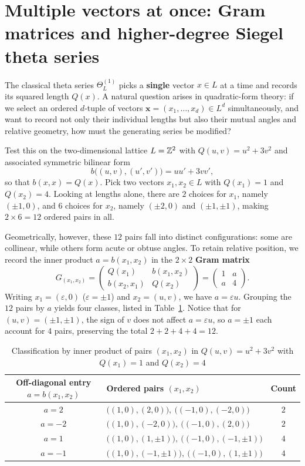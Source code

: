 \section{Multiple vectors at once: Gram matrices and higher-degree Siegel theta series}

The classical theta series $\Theta_L^{(1)}$ picks a \textbf{single} vector $x\in L$ at a time and records its squared length $Q(x)$. A natural question arises in quadratic-form theory: if we select an ordered $d$-tuple of vectors $\mathbf x=(x_1,\ldots,x_d)\in L^d$ simultaneously, and want to record not only their individual lengths but also their mutual angles and relative geometry, how must the generating series be modified?

Test this on the two-dimensional lattice $L=\mathbb{Z}^2$ with $Q(u,v)=u^2+3v^2$ and associated symmetric bilinear form
\[
b\bigl((u,v),(u',v')\bigr)=uu'+3vv',
\]
so that $b(x,x)=Q(x)$. Pick two vectors $x_1,x_2\in L$ with $Q(x_1)=1$ and $Q(x_2)=4$. Looking at lengths alone, there are $2$ choices for $x_1$, namely $(\pm 1,0)$, and $6$ choices for $x_2$, namely $(\pm 2,0)$ and $(\pm 1,\pm 1)$, making $2\times 6=12$ ordered pairs in all.

Geometrically, however, these $12$ pairs fall into distinct configurations: some are collinear, while others form acute or obtuse angles. To retain relative position, we record the inner product $a=b(x_1,x_2)$ in the $2\times 2$ \textbf{Gram matrix}
\[
G_{(x_1,x_2)}=\begin{pmatrix} Q(x_1) & b(x_1,x_2) \\ b(x_2,x_1) & Q(x_2) \end{pmatrix}=\begin{pmatrix} 1 & a \\ a & 4 \end{pmatrix}.
\]
Writing $x_1=(\varepsilon,0)$ ($\varepsilon=\pm 1$) and $x_2=(u,v)$, we have $a=\varepsilon u$. Grouping the $12$ pairs by $a$ yields four classes, listed in Table~\ref{tab:appC-gram-pairs}. Notice that for $(u,v)=(\pm 1,\pm 1)$, the sign of $v$ does not affect $a=\varepsilon u$, so $a=\pm 1$ each account for $4$ pairs, preserving the total $2+2+4+4=12$.

\begin{table}[htbp]
\centering
\caption{Classification by inner product of pairs $(x_1,x_2)$ in $Q(u,v)=u^2+3v^2$ with $Q(x_1)=1$ and $Q(x_2)=4$}
\label{tab:appC-gram-pairs}
\small
\begin{tabular}{@{}clc@{}}
\toprule
Off-diagonal entry $a=b(x_1,x_2)$ & Ordered pairs $(x_1,x_2)$ & Count \\
\midrule
$a=2$ & $\bigl((1,0),(2,0)\bigr),\ \bigl((-1,0),(-2,0)\bigr)$ & $2$ \\
$a=-2$ & $\bigl((1,0),(-2,0)\bigr),\ \bigl((-1,0),(2,0)\bigr)$ & $2$ \\
$a=1$ & $\bigl((1,0),(1,\pm 1)\bigr),\ \bigl((-1,0),(-1,\pm 1)\bigr)$ & $4$ \\
$a=-1$ & $\bigl((1,0),(-1,\pm 1)\bigr),\ \bigl((-1,0),(1,\pm 1)\bigr)$ & $4$ \\
\bottomrule
\end{tabular}
\end{table}


